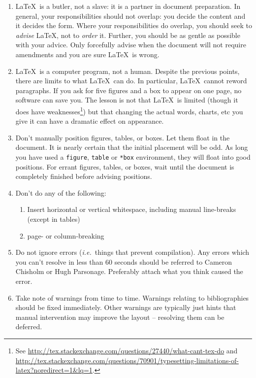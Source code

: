 \documentclass[a4paper,11pt]{scrreprt}\usepackage[]{graphicx}\usepackage[]{color}
\let\oldLaTeX\LaTeX
\renewcommand{\LaTeX}{\textrm{\oldLaTeX}}
\begin{document}
\begin{enumerate}
  \item \LaTeX\ is a butler, not a slave: it is a partner in document preparation. In general, your responsibilities should not overlap: you decide the content and it decides the form. Where your responsibilities do overlap, you should seek to \emph{advise} \LaTeX, not to \emph{order} it. Further, you should be as gentle as possible with your advice. Only forcefully advise when the document will not require amendments and you are sure \LaTeX\ is wrong. 
  \item \LaTeX\ is a computer program, not a human. Despite the previous points, there are limits to what \LaTeX\ can do. In particular, \LaTeX\ cannot reword paragraphs. If you ask for five figures and a box to appear on one page, no software can save you. The lesson is not that \LaTeX\ is limited (though it does have weaknesses\footnote{See \url{http://tex.stackexchange.com/questions/27440/what-cant-tex-do} and \url{http://tex.stackexchange.com/questions/70901/typesetting-limitations-of-latex?noredirect=1&lq=1}.}) but that changing the actual words, charts, etc you give it can have a dramatic effect on appearance. 
  \item Don't manually position figures, tables, or boxes. Let them float in the document. It is nearly certain that the initial placement will be odd. As long you have used a \verb=figure=, \verb=table= or \verb=*box= environment, they will float into good positions. For errant figures, tables, or boxes, wait until the document is completely finished before advising positions.
  \item Don't do any of the following:
  \begin{enumerate}
   \item Insert horizontal or vertical whitespace, including manual line-breaks (except in tables)
   \item page- or column-breaking
  \end{enumerate}
  \item Do not ignore errors (\emph{i.e.}~things that prevent compilation). Any errors which you can't resolve in less than 60 seconds should be referred to Cameron Chisholm or Hugh Parsonage. Preferably attach what you think caused the error.
  \item Take note of warnings from time to time. Warnings relating to bibliographies should be fixed immediately. Other warnings are typically just hints that manual intervention may improve the layout -- resolving them can be deferred.


\end{enumerate}
\end{document}
